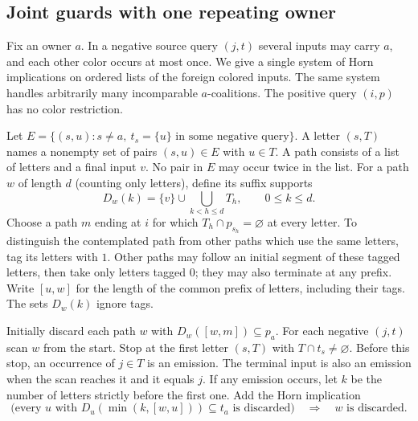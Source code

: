 \subsection{Joint guards with one repeating owner}
\label{app:core-ordered-guards}

Fix an owner $a$. In a negative source query $(j,t)$ several inputs
may carry $a$, and each other color occurs at most once. We give a
single system of Horn implications on ordered lists of the foreign
colored inputs. The same system handles arbitrarily many incomparable
$a$-coalitions. The positive query $(i,p)$ has no color restriction.

Let $E=\{(s,u):s\ne a,\ t_s=\{u\}\text{ in some negative query}\}$.
A letter $(s,T)$ names a nonempty set of pairs $(s,u)\in E$ with
$u\in T$. A path consists of a list of letters and a final input $v$.
No pair in $E$ may occur twice in the list. For a path $w$ of length
$d$ (counting only letters), define its suffix supports
\[
 D_w(k)=\{v\}\cup\bigcup_{k<h\le d}T_h,\qquad 0\le k\le d.
\]
Choose a path $m$ ending at $i$ for which
$T_h\cap p_{s_h}=\varnothing$ at every letter.
To distinguish the contemplated path from other paths which use the
same letters, tag its letters with $1$. Other paths may follow an
initial segment of these tagged letters, then take only letters
tagged $0$; they may also terminate at any prefix. Write $[u,w]$ for
the length of the common prefix of letters, including their tags.
The sets $D_w(k)$ ignore tags.

Initially discard each path $w$ with $D_w([w,m])\subseteq p_a$.
For each negative $(j,t)$ scan $w$ from the start. Stop at the first
letter $(s,T)$ with $T\cap t_s\ne\varnothing$. Before this stop,
an occurrence of $j\in T$ is an emission. The terminal input is also
an emission when the scan reaches it and it equals $j$. If any
emission occurs, let $k$ be the number of letters strictly before the
first one. Add the Horn implication
\begin{equation}\label{core:eq:ordered-guard-horn}
 \bigl(\text{every }u\text{ with }D_u(\min(k,[w,u]))\subseteq t_a
                    \text{ is discarded}\bigr)
 \quad\Longrightarrow\quad w\text{ is discarded}.
\end{equation}

